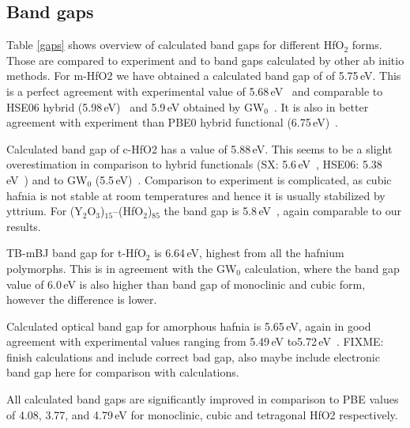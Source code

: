 \documentclass[10pt,a4paper,twocolumn]{article}
\begin{document}
\subsection{Band gaps}

Table \ref{gaps} shows overview of calculated band gaps for different HfO$_2$ forms.
Those are compared to experiment and to band gaps calculated by other ab initio methods.
For m-HfO2 we have obtained a calculated band gap of of 5.75\,eV.
This is a perfect agreement with experimental value of 5.68\,eV~\cite{Balog1977} and comparable to HSE06 hybrid (5.98\,eV)~\cite{Komsa2010} and 5.9\,eV obtained by GW$_0$~\cite{Gruning2010}.
It is also in better agreement with experiment than PBE0 hybrid functional (6.75\,eV)~\cite{Komsa2010}.

Calculated band gap of c-HfO2 has a value of 5.88\,eV.
This seems to be a slight overestimation in comparison to hybrid functionals (SX: 5.6\,eV~\cite{Clark2010}, HSE06: 5.38\,eV~\cite{Yang2014}) and to GW$_0$ (5.5\,eV)~\cite{Gruning2010}.
Comparison to experiment is complicated, as cubic hafnia is not stable at room temperatures and hence it is usually stabilized by yttrium.
For (Y$_2$O$_3$)$_{15}$--(HfO$_2$)$_{85}$ the band gap is 5.8\,eV~\cite{Lim2002}, again comparable to our results.

TB-mBJ band gap for t-HfO$_2$ is 6.64\,eV, highest from all the hafnium polymorphs.
This is in agreement with the GW$_0$ calculation, where the band gap value of 6.0\,eV is also higher than band gap of monoclinic and cubic form, however the difference is lower.

Calculated optical band gap for amorphous hafnia is 5.65\,eV, again in good agreement with experimental values ranging from 5.49\,eV to5.72\,eV~\cite{Takeuchi2004, Nguyen2005}.
FIXME: finish calculations and include correct bad gap, also maybe include electronic band gap here for comparison with calculations.

All calculated band gaps are significantly improved in comparison to PBE values of 4.08, 3.77, and 4.79\,eV for monoclinic, cubic and tetragonal HfO2 respectively.
 
\end{document}

